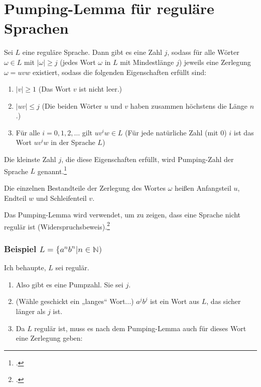\documentclass{lehramt-informatik-haupt}
\begin{document}
\chapter{Pumping-Lemma für reguläre Sprachen}

%
\noindent
Sei $L$ eine reguläre Sprache. Dann gibt es eine Zahl $j$, sodass für
alle Wörter $\omega \in L$  mit $|\omega| \geq j$ (jedes Wort $\omega$
in $L$ mit Mindestlänge $j$) jeweils eine Zerlegung $\omega = uvw$
existiert, sodass die folgenden Eigenschaften erfüllt sind:

\begin{enumerate}
\item $|v| \geq 1$
(Das Wort $v$ ist nicht leer.)

\item $|uv| \leq j$
(Die beiden Wörter $u$ und $v$ haben zusammen höchstens die Länge $n$.)

\item Für alle $i = 0, 1, 2, \dots$ gilt $uv^iw \in L$
(Für jede natürliche Zahl (mit 0) $i$ ist das Wort $uv^{i}w$ in der
Sprache $L$)
\end{enumerate}

Die kleinste Zahl $j$, die diese Eigenschaften erfüllt, wird
Pumping-Zahl der Sprache $L$ genannt.\footcite{wiki:pumping-lemma}

Die einzelnen Bestandteile der Zerlegung des Wortes $\omega$ heißen
Anfangsteil $u$, Endteil $w$ und Schleifenteil $v$.

\noindent
Das Pumping-Lemma wird verwendet, um zu zeigen, dass eine
Sprache nicht regulär ist (Widerspruchsbeweis).\footcite[Seite 63]{theo:fs:1}

%

\subsection{Beispiel $L = \{a^n b^n | n \in \mathbb{N})$}

Ich behaupte, $L$ sei regulär.

\begin{enumerate}
\item Also gibt es eine Pumpzahl. Sie sei $j$.

\item (Wähle geschickt ein „langes“ Wort...)
$a^j b^j$ ist ein Wort aus $L$, das sicher länger als $j$ ist.

\item Da $L$ regulär ist, muss es nach dem Pumping-Lemma auch für dieses
Wort eine Zerlegung geben:
\end{enumerate}
\end{document}
